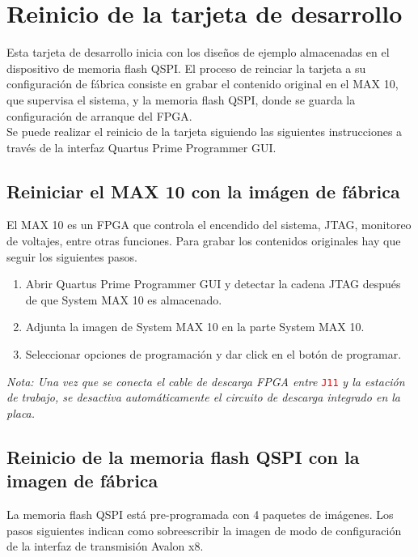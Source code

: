 \section{Reinicio de la tarjeta de desarrollo}

    Esta tarjeta de desarrollo inicia con los diseños de ejemplo  almacenadas en el dispositivo de memoria flash QSPI. El proceso de reinciar la tarjeta a su configuraci\'on de f\'abrica consiste en grabar el contenido original en el MAX 10, que supervisa el sistema, y la memoria flash QSPI, donde se guarda la configuraci\'on de arranque del FPGA.\\ 
    
    Se puede realizar el reinicio de la tarjeta siguiendo las siguientes instrucciones a trav\'es de la interfaz Quartus Prime Programmer GUI.

\subsection{Reiniciar el MAX 10 con la im\'agen de f\'abrica}

El MAX 10 es un FPGA que controla el encendido del sistema, JTAG, monitoreo de voltajes, entre otras funciones. Para grabar los contenidos originales hay que seguir los siguientes pasos.

\begin{enumerate}
    \item Abrir Quartus Prime Programmer GUI y detectar la cadena JTAG despu\'es de que System MAX 10 es almacenado.
    \item Adjunta la imagen de System MAX 10 en la parte System MAX 10.
    \item Seleccionar opciones de programaci\'on y dar click en el bot\'on de programar.
\end{enumerate}

\textit{Nota: Una vez que se conecta el cable de descarga FPGA entre} \texttt{\textcolor{red}{J11}} \textit{y la estaci\'on de trabajo, se desactiva autom\'aticamente el circuito de descarga integrado en la placa.}

\subsection{Reinicio de la memoria flash QSPI con la imagen de f\'abrica}

    La memoria flash QSPI est\'a pre-programada con 4 paquetes de im\'agenes. Los pasos siguientes indican como sobreescribir la imagen de modo de configuraci\'on de la interfaz de transmisi\'on Avalon x8.

